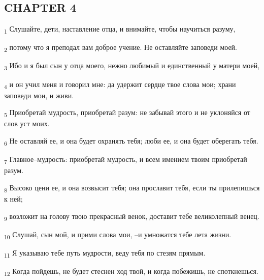 \subsection{CHAPTER 4}
\begin{tcolorbox}
\textsubscript{1} Слушайте, дети, наставление отца, и внимайте, чтобы научиться разуму,
\end{tcolorbox}
\begin{tcolorbox}
\textsubscript{2} потому что я преподал вам доброе учение. Не оставляйте заповеди моей.
\end{tcolorbox}
\begin{tcolorbox}
\textsubscript{3} Ибо и я был сын у отца моего, нежно любимый и единственный у матери моей,
\end{tcolorbox}
\begin{tcolorbox}
\textsubscript{4} и он учил меня и говорил мне: да удержит сердце твое слова мои; храни заповеди мои, и живи.
\end{tcolorbox}
\begin{tcolorbox}
\textsubscript{5} Приобретай мудрость, приобретай разум: не забывай этого и не уклоняйся от слов уст моих.
\end{tcolorbox}
\begin{tcolorbox}
\textsubscript{6} Не оставляй ее, и она будет охранять тебя; люби ее, и она будет оберегать тебя.
\end{tcolorbox}
\begin{tcolorbox}
\textsubscript{7} Главное--мудрость: приобретай мудрость, и всем имением твоим приобретай разум.
\end{tcolorbox}
\begin{tcolorbox}
\textsubscript{8} Высоко цени ее, и она возвысит тебя; она прославит тебя, если ты прилепишься к ней;
\end{tcolorbox}
\begin{tcolorbox}
\textsubscript{9} возложит на голову твою прекрасный венок, доставит тебе великолепный венец.
\end{tcolorbox}
\begin{tcolorbox}
\textsubscript{10} Слушай, сын мой, и прими слова мои, --и умножатся тебе лета жизни.
\end{tcolorbox}
\begin{tcolorbox}
\textsubscript{11} Я указываю тебе путь мудрости, веду тебя по стезям прямым.
\end{tcolorbox}
\begin{tcolorbox}
\textsubscript{12} Когда пойдешь, не будет стеснен ход твой, и когда побежишь, не споткнешься.
\end{tcolorbox}
